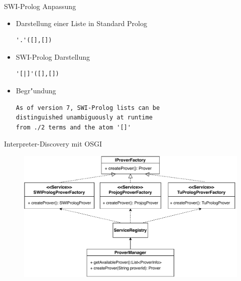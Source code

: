 \documentclass[18pt]{beamer}
\begin{document}
\begin{frame}[fragile]{SWI-Prolog Anpassung}
\begin{itemize}
\item Darstellung einer Liste in Standard Prolog
\begin{verbatim}
'.'([],[])
\end{verbatim}
\item SWI-Prolog Darstellung
\begin{verbatim}
'[|]'([],[])
\end{verbatim}
\vspace{0.5cm}
\item Begr"undung
\begin{verbatim}
As of version 7, SWI-Prolog lists can be 
distinguished unambiguously at runtime
from ./2 terms and the atom '[]'
\end{verbatim}
\end{itemize}
\end{frame}
\begin{frame}{Interpreter-Discovery mit OSGI}
\begin{figure}[h]
\centering
\includegraphics[width=1\textwidth]{osgi.pdf}
\end{figure}
\end{frame}
\end{document}
